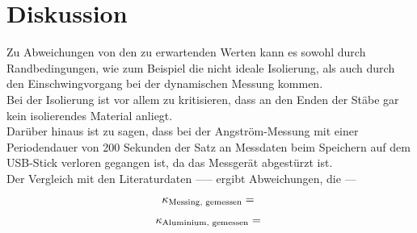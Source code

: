 \section{Diskussion}
\label{sec:Diskussion}

Zu Abweichungen von den zu erwartenden Werten kann es sowohl durch Randbedingungen, wie zum 
Beispiel die nicht ideale Isolierung, als auch durch den Einschwingvorgang bei der 
dynamischen Messung kommen. \\
Bei der Isolierung ist vor allem zu kritisieren, dass an den Enden der Stäbe gar kein 
isolierendes Material anliegt.\\

Darüber hinaus ist zu sagen, dass bei der Angström-Messung mit einer Periodendauer von 
200 Sekunden der Satz an Messdaten beim Speichern auf dem USB-Stick verloren gegangen ist, 
da das Messgerät abgestürzt ist.\\

Der Vergleich mit den Literaturdaten ----- ergibt Abweichungen, die ---

\begin{equation*}
    \kappa_{\textrm{Messing, gemessen}} =  \\
\end{equation*}

\begin{equation*}
    \kappa_{\textrm{Aluminium, gemessen}} =  \\
\end{equation*}


